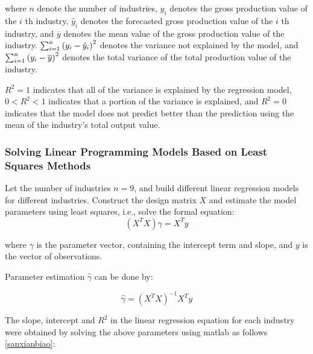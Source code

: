 \documentclass[12pt]{article}  %
\begin{document}
	where $n$ denote the number of industries, $y_i$ denotes the gross production value of the $i$ th industry, ${\hat y_i}$ denotes the forecasted gross production value of the $i$ th industry, and $\overline{y}$ denotes the mean value of the gross production value of the industry. $\sum\nolimits_{i = 1}^{\rm{n}} {{{({y_i} - {{\hat y}_i})}^2}} $ denotes the variance not explained by the model, and $\sum\nolimits_{i = 1}^{\rm{n}} {{{({y_i} - \overline y )}^2}} $ denotes the total variance of the total production value of the industry.
	
	$R^2 = 1$ indicates that all of the variance is explained by the regression model, $0<R^2<1$ indicates that a portion of the variance is explained, and $R^2 = 0$ indicates that the model does not predict better than the prediction using the mean of the industry's total output value.
	
\subsubsection{Solving Linear Programming Models Based on Least Squares Methods}

	Let the number of industries $n=9$, and build different linear regression models for different industries. Construct the design matrix $X$ and estimate the model parameters using least squares, i.e., solve the formal equation:
		\begin{equation}
			({X^T}X)\gamma  = {X^T}y
		\end{equation}
	
	where $\gamma$ is the parameter vector, containing the intercept term and slope, and $y$ is the vector of observations.
	
	Parameter estimation $\hat \gamma$ can be done by:

		\begin{equation}
			\hat \gamma  = {({X^T}X)^{ - 1}}{X^T}y
		\end{equation}

	The slope, intercept and $R^2$ in the linear regression equation for each industry were obtained by solving the above parameters using matlab as follows \ref{sanxianbiao}:
	
\end{document}
